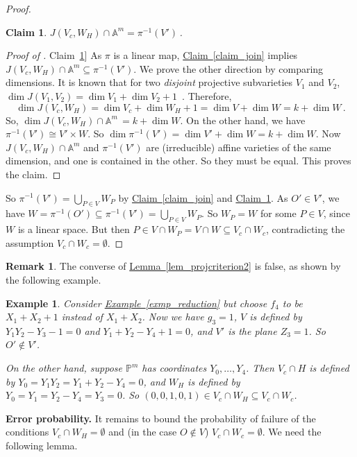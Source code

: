 \documentclass[11pt]{article}
\numberwithin{equation}{section}
\newtheorem{claim}[theorem]{Claim}
\theoremstyle{definition}
\newtheorem{remark}[theorem]{Remark}
\theoremstyle{plain}
\newcommand{\expref}[2]{\hyperref[#2]{#1~\ref{#2}}}
\newtheorem{exmp}{Example}
\newcommand{\aff}{\mathbb{A}}
\newcommand{\proj}{\mathbb{P}}
\begin{document}
\begin{proof}
\begin{claim}\label{claim_join2}
  $J(V_c,W_H)\cap \aff^m=\pi^{-1}(V')$\,.
  \end{claim} 
 \begin{proof}[Proof of \expref{Claim}{claim_join2}]
  As $\pi$ is a linear map, \expref{Claim}{claim_join}  implies $J(V_c,W_H)\cap \aff^m\subseteq\pi^{-1}(V')$. We prove the other direction by comparing dimensions.
It is known that for two \emph{disjoint} projective subvarieties $V_1$ and $V_2$,  $\dim J(V_1,V_2)=\dim V_1+\dim V_2+1$~\cite[Proposition~11.37 and Exercise~11.38]{Har92}. Therefore,
\[
\dim J(V_c, W_H)=\dim V_c +\dim W_H+1=\dim V+\dim W=k+\dim W \,.
\]
So, $\dim J(V_c,W_H) \cap \aff^m \,= k+\dim W$.
On the other hand, we have $\pi^{-1}(V')\cong V'\times W$. So $\dim \pi^{-1}(V')=\dim V'+\dim W=k+\dim W$. Now $J(V_c,W_H)\cap \aff^m$ and $\pi^{-1}(V')$ are (irreducible) affine varieties of the same dimension, and one is contained in the other. So they must be equal. This proves the claim.
\end{proof}

So  $\pi^{-1}(V')=\bigcup_{P\in V} W_P$ by \expref{Claim}{claim_join} and \expref{Claim}{claim_join2}.
As $O'\in V'$, we have $W=\pi^{-1}(O')\subseteq \pi^{-1}(V')=\bigcup_{P\in V} W_P$. So $W_P=W$ for some $P\in V$, since $W$ is a linear space. But then $P\in V\cap W_P=V\cap W\subseteq V_c\cap W_c$, contradicting the assumption $V_c\cap W_c=\emptyset$.
 \end{proof}
\noindent
%
\begin{remark}   %
The converse of \expref{Lemma}{lem_projcriterion2} is false, as shown by the following example.  %

\begin{exmp}\label{exmp-projcrit}
Consider \expref{Example}{exmp_reduction} but choose $f_4$ to be $X_1+X_2+1$ instead of $X_1+X_2$. Now we have $g_3=1$, $V$ is defined by $Y_1Y_2-Y_3-1=0$ and $Y_1+Y_2-Y_4+1=0$, and $V'$ is the plane $Z_3=1$. So $O'\not\in V'$. 

On the other hand, suppose $\proj^m$ has coordinates $Y_0,\dots,Y_4$. Then $V_c\cap H$ is defined by $Y_0=Y_1Y_2=Y_1+Y_2-Y_4=0$, and $W_H$ is defined by $Y_0=Y_1=Y_2-Y_4=Y_3=0$. So $(0,0,1,0,1)\in V_c\cap W_H\subseteq V_c\cap W_c$.
\end{exmp}
\end{remark}

\smallskip\noindent
\textbf{Error probability.} It remains to bound the probability of failure of the conditions $V_c\cap W_H=\emptyset$ and (in the case $O\not\in V$) $V_c\cap W_c=\emptyset$. We need the following lemma.
\end{document}
